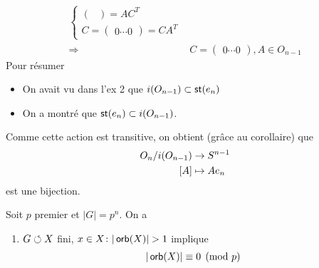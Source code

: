 \documentclass[french,a4paper,10pt]{article}
\begin{document}
\begin{td-sol}[Suite]
\[\begin{aligned}
\begin{cases}
\begin{pmatrix}
				\end{pmatrix}=AC^T\\
			C=\begin{pmatrix}
				0\cdots0
			\end{pmatrix}=CA^T
			\end{cases}\\
		\Longrightarrow&C=\begin{pmatrix}
			0\cdots0
		\end{pmatrix},A\in O_{n-1}
			\end{aligned}\]
		Pour résumer
			\begin{itemize}
				\item On avait vu dans l'ex 2 que $i(O_{n-1})\subset \operatorname{\mathsf{st}}(e_n)$\\
				\item On a montré que $\operatorname{\mathsf{st}}(e_n)\subset i(O_{n-1})$.
			\end{itemize}
		Comme cette action est transitive, on obtient (grâce au corollaire) que 
			\[\begin{aligned}
				O_n/i(O_{n-1})&\to S^{n-1}\\
				\mathopen{[}A\mathclose{]}&\mapsto Ae_n
			\end{aligned}\]
		est une bijection.
	\end{td-sol}
	\begin{td-exo}
		Soit $p$ premier et $|G|=p^n$. On a
			\begin{enumerate}[label=$(\roman*)$]
				\item 
				$G\circlearrowleft X$ fini, $x\in X\colon |\orb(X)|>1$ implique
					\[\begin{aligned}
						|\operatorname{\mathsf{orb}}(X)|\equiv 0\pmod p
					\end{aligned}\]
			\end{enumerate}
	\end{td-exo}
\end{document}
